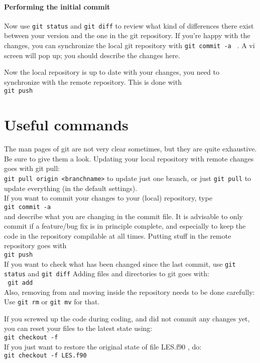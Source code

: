 \documentclass[a4paper,10pt] {article}
\begin{document}
 \paragraph* {Performing the initial commit} 
Now use      \verb|git status|    and     \verb|git diff|     to review what kind of differences there exist between your version and the one in the git repository. If you're happy with the changes, you can synchronize the local git repository with     \verb|git commit -a |  . A vi screen will pop up; you should describe the changes here.

Now the local repository is up to date with your changes, you need to synchronize with the remote repository. This is done with    \\
  \verb|git push|  



  \section{Useful commands} 
The man pages of git are not very clear sometimes, but they are quite exhaustive. Be sure to give them a look.
Updating your local repository with remote changes goes with git pull:  \\
  \verb|git pull origin <branchname>|    to update just one branch, or just     \verb|git pull|     to update everything (in the default settings).\\
If you want to commit your changes to your (local) repository, type  \\
  \verb|git commit -a| \\
and describe what you are changing in the commit file. It is advisable to only commit if a feature/bug fix is in principle complete, and especially to keep the code in the repository compilable at all times. Putting stuff in the remote repository goes with   \\
  \verb|git push  | \\
If you want to check what has been changed since the last commit, use     \verb|git status|  and   \verb|git diff|    
Adding files and directories to git goes with:\\
    \verb| git add |  \\
Also, removing from and moving inside the repository needs to be done carefully: Use     \verb|git rm|  or \verb|git mv|    for that.

If you screwed up the code during coding, and did not commit any changes yet, you can reset your files to the latest state using:  \\
  \verb|git checkout -f|   \\
If you just want to restore the original state of file   LES.f90 , do:  \\
  \verb|git checkout -f LES.f90 |\\
\end{document}

